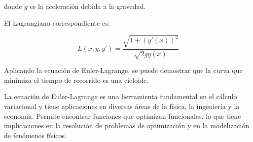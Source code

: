 donde $g$ es la aceleración debida a la gravedad.

El Lagrangiano correspondiente es:

\begin{equation}
	L(x, y, y') = \frac{\sqrt{1 + (y'(x))^2}}{\sqrt{2gy(x)}}
\end{equation}

Aplicando la ecuación de Euler-Lagrange, se puede demostrar que la curva que minimiza el tiempo de recorrido es una cicloide.

La ecuación de Euler-Lagrange es una herramienta fundamental en el cálculo variacional y tiene aplicaciones en diversas áreas de la física, la ingeniería y la economía.  Permite encontrar funciones que optimizan funcionales, lo que tiene implicaciones en la resolución de problemas de optimización y en la modelización de fenómenos físicos.
